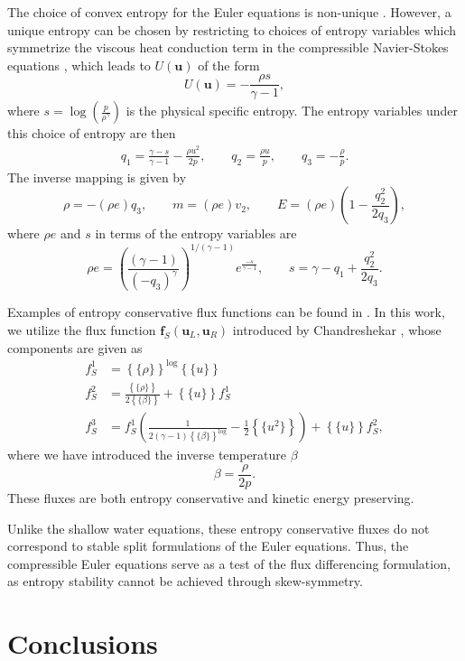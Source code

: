 \documentclass[preprint,10pt]{article}
\theoremstyle{definition}
\theoremstyle{lemma}
\theoremstyle{theorem}
\theoremstyle{assumption}
\newcommand{\LRp}[1]{\left( #1 \right)}
\newcommand{\LRc}[1]{\left\{ #1 \right\}}
\newcommand{\avg}[1] {\ensuremath{\LRc{\!\{#1\}\!}}}
\newcommand{\note}[1]{{\color{blue}{#1}}}
\begin{document}
The choice of convex entropy for the Euler equations is non-unique \cite{harten1983symmetric}.  However, a unique entropy can be chosen by restricting to choices of entropy variables which symmetrize the viscous heat conduction term in the compressible Navier-Stokes equations \cite{hughes1986new}, which leads to $U(\bm{u})$ of the form
\[
U(\bm{u}) = -\frac{\rho s}{\gamma-1},
\]
where $s = \log\LRp{\frac{p}{\rho^\gamma}}$ is the physical specific entropy.  The entropy variables under this choice of entropy are then
\begin{align*}
q_1 = \frac{\gamma-s}{\gamma-1} - \frac{\rho u^2}{2p}, \qquad q_2 = \frac{\rho u}{p}, \qquad q_3 = -\frac{\rho}{p}.
\end{align*}
The inverse mapping is given by 
\[
\rho = -(\rho e) q_3, \qquad m = (\rho e) v_2, \qquad E = (\rho e)\LRp{1 - \frac{q_2^2}{2 q_3}},
\]
where $\rho e$ and $s$ in terms of the entropy variables are 
\[
\rho e = \LRp{\frac{(\gamma-1)}{\LRp{-q_3}^{\gamma}}}^{1/(\gamma-1)}e^{\frac{-s}{\gamma-1}}, \qquad s = \gamma - q_1 + \frac{q_2^2}{2q_3}.
\]

Examples of entropy conservative flux functions can be found in \cite{ismail2009affordable, chandrashekar2013kinetic}.  In this work, we utilize the flux function $\bm{f}_S(\bm{u}_L,\bm{u}_R)$ introduced by Chandreshekar \cite{chandrashekar2013kinetic}, whose components are given as
\begin{align*}
f^1_S &= \avg{\rho}^{\log} \avg{u}\\
f^2_S &= \frac{\avg{\rho}}{2\avg{\beta}} + \avg{u}f^1_S\\
f^3_S &= f^1_S\LRp{\frac{1}{2(\gamma-1)\avg{\beta}^{\log}} - \frac{1}{2}\avg{u^2}} + \avg{u}f^2_S,
\end{align*}
where we have introduced the inverse temperature $\beta$
\[
\beta = \frac{\rho}{2p}.
\]
These fluxes are both entropy conservative and kinetic energy preserving.  

Unlike the shallow water equations, these entropy conservative fluxes do not correspond to stable split formulations of the Euler equations.  Thus, the compressible Euler equations serve as a test of the flux differencing formulation, as entropy stability cannot be achieved through skew-symmetry.  

\note{Show how RHS residual depends on tolerance on the log mean}

\section{Conclusions}
\end{document}
